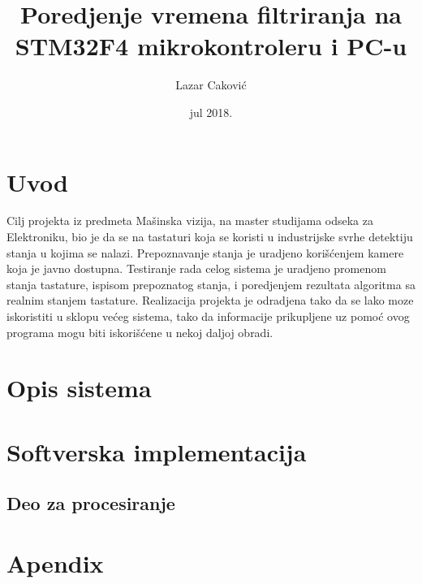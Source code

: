 \documentclass[a4paper,12pt, projekat]{etf}
\title{Poredjenje vremena filtriranja na STM32F4 mikrokontroleru i PC-u}
\author{Lazar Caković}
\date{jul 2018.}
\begin{document}
	\maketitle

	\tableofcontents

	\listoffigures

	\newpage

	\chapter{Uvod}
        Cilj projekta iz predmeta Ma\v{s}inska vizija, na master studijama odseka
        za Elektroniku, bio je da se na tastaturi koja se koristi u industrijske
        svrhe detektiju stanja u kojima se nalazi. Prepoznavanje stanja je
        uradjeno kori\v{s}\'{c}enjem kamere koja je javno dostupna. Testiranje
        rada celog sistema je uradjeno promenom stanja tastature, ispisom
        prepoznatog stanja, i poredjenjem rezultata algoritma sa realnim
        stanjem tastature. Realizacija projekta je odradjena tako
        da se lako moze iskoristiti u sklopu ve\'{c}eg sistema, tako da informacije
        prikupljene uz pomo\'{c} ovog programa mogu biti iskori\v{s}\'{c}ene u nekoj daljoj
        obradi.

        \newpage

        \chapter{Opis sistema}

        \newpage

        \chapter{Softverska implementacija}

        \section{Deo za procesiranje}

        \chapter{Apendix}

\begin{verbatim}


\end{verbatim}
\end{document}
